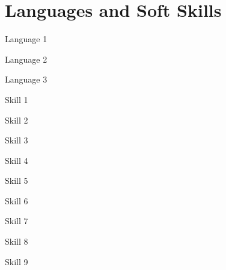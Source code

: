 \section{\faComments \hspace{0.1cm} Languages and Soft Skills}
\vspace{-10pt}

    \begin{multicols}{4}

        \resumeSubHeadingListStart

        \resumeSubheading
            {Language 1}{}
            {}{}

        \vspace{-10pt}
        \resumeSubheading
            {Language 2}{}
            {}{}

        \vspace{-10pt}
        \resumeSubheading
            {Language 3}{}
            {}{}

        \vspace{-10pt}
        \resumeSubheading
            {Skill 1}{}
            {}{}

        \vspace{-10pt}
        \resumeSubheading
            {Skill 2}{}
            {}{}
            
        \vspace{-10pt}
        \resumeSubheading
            {Skill 3}{}
            {}{}

        \vspace{-10pt}
        \resumeSubheading
            {Skill 4}{}
            {}{}

        \vspace{-10pt}
        \resumeSubheading
            {Skill 5}{}
            {}{}

        \vspace{-10pt}
        \resumeSubheading
            {Skill 6}{}
            {}{}

        \vspace{-10pt}
        \resumeSubheading
            {Skill 7}{}
            {}{}

        \vspace{-10pt}
        \resumeSubheading
            {Skill 8}{}
            {}{}

        \vspace{-10pt}
        \resumeSubheading
            {Skill 9}{}
            {}{}

        \resumeSubHeadingListEnd
        
    \end{multicols}
